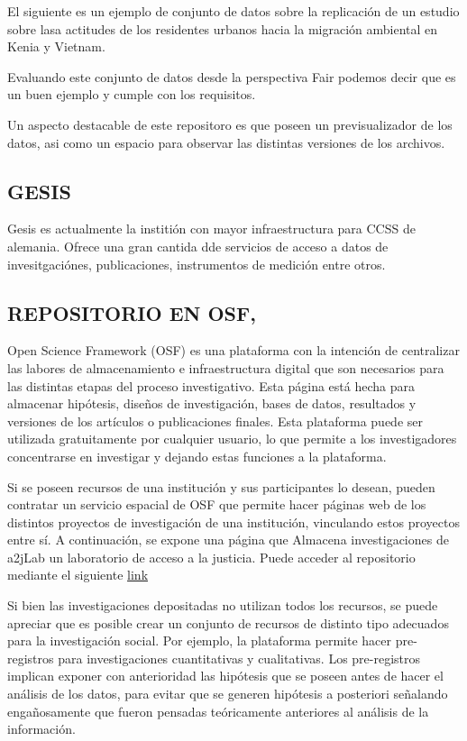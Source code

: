 \documentclass[
  14pt,
]{book}
\begin{document}
El siguiente es un ejemplo de conjunto de datos sobre la replicación de un estudio sobre lasa actitudes de los residentes urbanos hacia la migración ambiental en Kenia y Vietnam.

Evaluando este conjunto de datos desde la perspectiva Fair podemos decir que es un buen ejemplo y cumple con los requisitos.

Un aspecto destacable de este repositoro es que poseen un previsualizador de los datos, asi como un espacio para observar las distintas versiones de los archivos.

\hypertarget{gesis}{%
\subsection{GESIS}\label{gesis}}

Gesis es actualmente la institión con mayor infraestructura para CCSS de alemania. Ofrece una gran cantida dde servicios de acceso a datos de invesitgaciónes, publicaciones, instrumentos de medición entre otros.

\citet{europeancommissionbrussels_Flash_2015}

\hypertarget{repositorio-en-osf}{%
\subsection{REPOSITORIO EN OSF,}\label{repositorio-en-osf}}

Open Science Framework (OSF) es una plataforma con la intención de centralizar las labores de almacenamiento e infraestructura digital que son necesarios para las distintas etapas del proceso investigativo. Esta página está hecha para almacenar hipótesis, diseños de investigación, bases de datos, resultados y versiones de los artículos o publicaciones finales. Esta plataforma puede ser utilizada gratuitamente por cualquier usuario, lo que permite a los investigadores concentrarse en investigar y dejando estas funciones a la plataforma.

Si se poseen recursos de una institución y sus participantes lo desean, pueden contratar un servicio espacial de OSF que permite hacer páginas web de los distintos proyectos de investigación de una institución, vinculando estos proyectos entre sí. A continuación, se expone una página que Almacena investigaciones de a2jLab un laboratorio de acceso a la justicia. Puede acceder al repositorio mediante el siguiente \href{https://osf.io/institutions/a2jlab/}{link}

Si bien las investigaciones depositadas no utilizan todos los recursos, se puede apreciar que es posible crear un conjunto de recursos de distinto tipo adecuados para la investigación social. Por ejemplo, la plataforma permite hacer pre-registros para investigaciones cuantitativas y cualitativas. Los pre-registros implican exponer con anterioridad las hipótesis que se poseen antes de hacer el análisis de los datos, para evitar que se generen hipótesis a posteriori señalando engañosamente que fueron pensadas teóricamente anteriores al análisis de la información.
\end{document}
